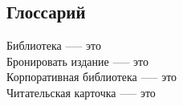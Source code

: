 \documentclass[./intro.tex]{subfiles}
\begin{document}
\subsection{Глоссарий}
\noindent Библиотека ––– это\\
Бронировать издание ––– это\\
Корпоративная библиотека ––– это\\
Читательская карточка ––– это\\
\end{document}
